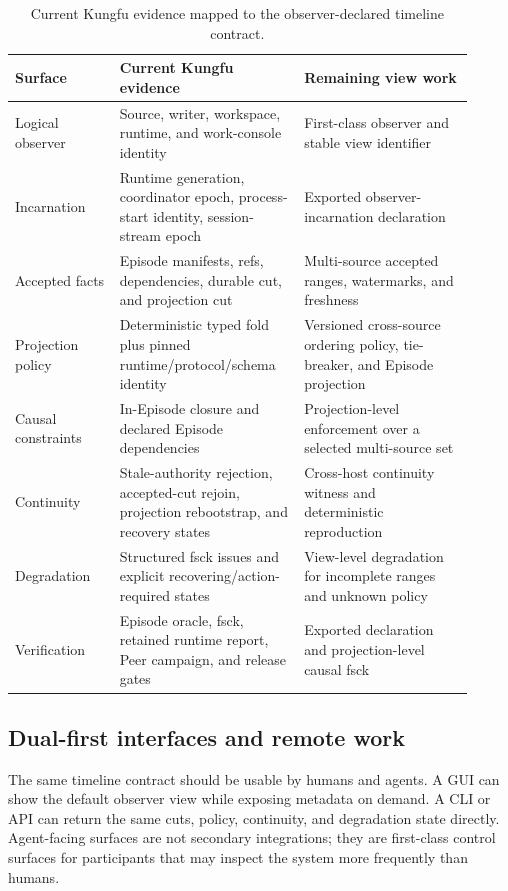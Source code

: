 \begin{table}[ht]
\centering
\small
\begin{tabular}{>{\raggedright\arraybackslash}p{0.21\linewidth}>{\raggedright\arraybackslash}p{0.36\linewidth}>{\raggedright\arraybackslash}p{0.34\linewidth}}
\toprule
Surface & Current Kungfu evidence & Remaining view work \\
\midrule
Logical observer & Source, writer, workspace, runtime, and work-console identity & First-class observer and stable view identifier \\
Incarnation & Runtime generation, coordinator epoch, process-start identity, session-stream epoch & Exported observer-incarnation declaration \\
Accepted facts & Episode manifests, refs, dependencies, durable cut, and projection cut & Multi-source accepted ranges, watermarks, and freshness \\
Projection policy & Deterministic typed fold plus pinned runtime/protocol/schema identity & Versioned cross-source ordering policy, tie-breaker, and Episode projection \\
Causal constraints & In-Episode closure and declared Episode dependencies & Projection-level enforcement over a selected multi-source set \\
Continuity & Stale-authority rejection, accepted-cut rejoin, projection rebootstrap, and recovery states & Cross-host continuity witness and deterministic reproduction \\
Degradation & Structured fsck issues and explicit recovering/action-required states & View-level degradation for incomplete ranges and unknown policy \\
Verification & Episode oracle, fsck, retained runtime report, Peer campaign, and release gates & Exported declaration and projection-level causal fsck \\
\bottomrule
\end{tabular}
\caption{Current Kungfu evidence mapped to the observer-declared timeline contract.}
\label{tab:kfd4-map}
\end{table}

\subsection{Dual-first interfaces and remote work}

The same timeline contract should be usable by humans and agents. A GUI can
show the default observer view while exposing metadata on demand. A CLI or API
can return the same cuts, policy, continuity, and degradation state directly.
Agent-facing surfaces are not secondary integrations; they are first-class
control surfaces for participants that may inspect the system more frequently
than humans.

